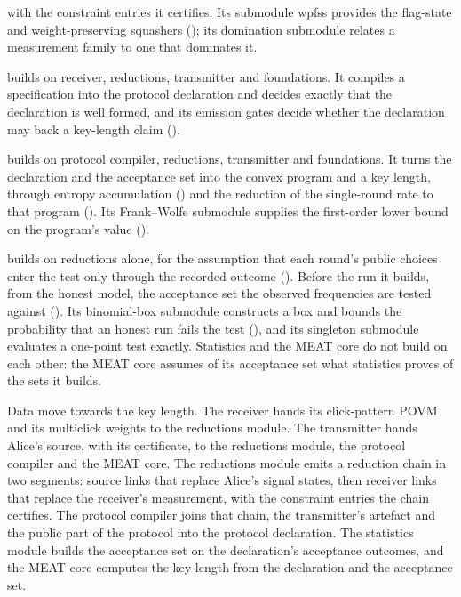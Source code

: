 \begin{description}[leftmargin=0pt,itemsep=3pt]
  with the constraint entries it certifies. Its submodule wpfss provides the
  flag-state and weight-preserving squashers
  (); its domination submodule relates a
  measurement family to one that dominates it.
\item[Protocol compiler (protocol-compiler)] builds on receiver,
  reductions, transmitter and foundations. It compiles a specification into
  the protocol declaration and decides exactly that the declaration is well
  formed, and its emission gates decide whether the declaration may back a
  key-length claim ().
\item[MEAT key-rate engine (meat-core)] builds on protocol compiler,
  reductions, transmitter and foundations. It turns the declaration and the
  acceptance set into the convex program and a key length, through entropy
  accumulation () and the reduction of
  the single-round rate to that program (). Its
  Frank--Wolfe submodule supplies the first-order lower bound on the program's
  value ().
\item[Acceptance statistics (statistics)] builds on reductions alone,
  for the assumption that each round's public choices enter the test only
  through the recorded outcome (). Before the run it
  builds, from the honest model, the acceptance set the observed frequencies
  are tested against (). Its
  binomial-box submodule constructs a box and bounds the probability that an
  honest run fails the test
  (), and its singleton
  submodule evaluates a one-point test exactly. Statistics and the MEAT core
  do not build on each other: the MEAT core assumes of its acceptance set what
  statistics proves of the sets it builds.
\end{description}

\noindent Data move towards the key length. The receiver hands its
click-pattern POVM and its multiclick weights to the reductions module. The
transmitter hands Alice's source, with its certificate, to the reductions
module, the protocol compiler and the MEAT core. The reductions module emits
a reduction chain in two segments: source links that replace Alice's signal
states, then receiver links that replace the receiver's measurement, with the
constraint entries the chain certifies. The protocol compiler joins that
chain, the transmitter's artefact and the public part of the protocol into
the protocol declaration. The statistics module builds the acceptance set on
the declaration's acceptance outcomes, and the MEAT core computes the key
length from the declaration and the acceptance set.

